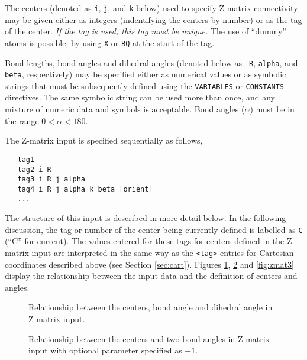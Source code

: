 
The centers (denoted as \verb+i+, \verb+j+, and \verb+k+ below) used
to specify Z-matrix connectivity may be given either as integers
(indentifying the centers by number) or as the tag of the center.
{\em If the tag is used, this tag must be unique.} The use of
``dummy'' atoms is possible, by using \verb+X+ or \verb+BQ+ at the
start of the tag.

Bond lengths, bond angles and dihedral angles (denoted below as {\tt
  R}, {\tt alpha}, and {\tt beta}, respectively) may be specified either as
numerical values or as symbolic strings that must be subsequently
defined using the \verb+VARIABLES+ or 
\verb+CONSTANTS+ directives.  The same symbolic string can be used
more than once, and any
mixture of numeric data and symbols is acceptable. Bond angles
($\alpha$) must be in the range $0 < \alpha < 180$.

The Z-matrix input is specified sequentially as follows,
\begin{verbatim}
   tag1
   tag2 i R
   tag3 i R j alpha
   tag4 i R j alpha k beta [orient]
   ...
\end{verbatim}

The structure of this input is described in more detail below.  
In the following discussion, the tag or number
of the center being currently defined is labelled as \verb+C+ (``C''
for current).  The values entered for these tags for centers 
defined in the Z-matrix input are interpreted
in the same way as the \verb+<tag>+ entries for Cartesian
coordinates described above (see Section \ref{sec:cart}).
Figures \ref{fig:zmat1}, \ref{fig:zmat2} and \ref{fig:zmat3}
display the relationship between the input data and the definition of
centers and angles.

\begin{figure}[htbp]
\centering
{}

\caption{\label{fig:zmat1} Relationship between the centers, bond angle
and dihedral angle in Z-matrix input.}
\end{figure}

\begin{figure}[htbp]
\centering
{}

\caption{\label{fig:zmat2} Relationship between the centers and two
  bond angles in Z-matrix input with optional parameter specified as $+1$.}
\end{figure}

